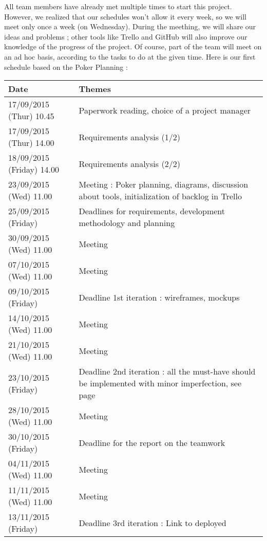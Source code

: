 All team members have already met multiple times to start this project. However, we realized that our
schedules won't allow it every week, so we will meet only once a
week (on Wednesday). During the meething, we will share our ideas and problems ;
other tools like Trello and GitHub will also improve our knowledge of the
progress of the project. Of course, part of the team will meet on an ad hoc basis, according to the tasks to do at the given time. Here is our first schedule based on
the Poker Planning : \newline

\noindent\begin{longtable}{|p{0.275\linewidth}|p{0.725\linewidth}|}
    \hline
    Date & Themes \\
    \hline
    \hline
    17/09/2015 (Thur) 10.45 & Paperwork reading, choice of a project
    manager \\
    \hline
    17/09/2015 (Thur) 14.00 & Requirements analysis (1/2) \\
    \hline
    18/09/2015 (Friday) 14.00 & Requirements analysis (2/2) \\
    \hline
    23/09/2015 (Wed) 11.00 & Meeting : Poker planning, diagrams,
    discussion about tools, initialization of backlog in Trello \\
    \hline
    25/09/2015 (Friday) & Deadlines for requirements, development methodology
    and planning \\
    \hline
    30/09/2015 (Wed) 11.00 & Meeting \\
    \hline
    07/10/2015 (Wed) 11.00 & Meeting \\
    \hline
    09/10/2015 (Friday) & Deadline 1st iteration : wireframes, mockups \\
    \hline
    14/10/2015 (Wed) 11.00 & Meeting \\
    \hline
    21/10/2015 (Wed) 11.00 & Meeting \\
    \hline
    23/10/2015 (Friday) & Deadline 2nd iteration : all the must-have
    should be implemented with minor imperfection, see
    page~\pageref{musthave} \\
    \hline
    28/10/2015 (Wed) 11.00 & Meeting \\
    \hline
    30/10/2015 (Friday) & Deadline for the report on the teamwork \\
    \hline
    04/11/2015 (Wed) 11.00 & Meeting \\
    \hline
    11/11/2015 (Wed) 11.00 & Meeting \\
    \hline
    13/11/2015 (Friday) & Deadline 3rd iteration : Link to deployed

\end{longtable}
